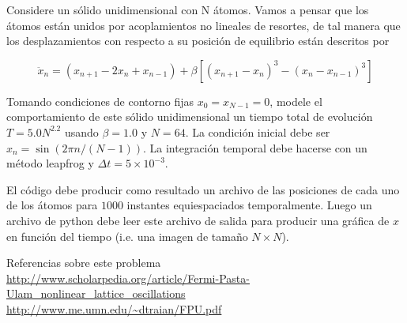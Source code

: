 \documentclass[11pt,letterpaper]{exam}
\begin{document}
\begin{questions}

Considere un s\'olido unidimensional con N \'atomos.
Vamos a pensar que los \'atomos est\'an unidos por acoplamientos no
lineales de resortes, de tal manera que los desplazamientos con respecto
a su posici\'on de equilibrio est\'an descritos por

\begin{equation}
\ddot{x}_n = (x_{n+1} - 2x_n + x_{n-1}) + \beta[(x_{n+1}-x_n)^3 - (x_n - x_{n-1})^3]
\end{equation}

Tomando condiciones de contorno fijas $x_{0}=x_{N-1}=0$, modele el comportamiento
de este s\'olido unidimensional un tiempo total de evoluci\'on $T=5.0N^{2.2}$
usando $\beta=1.0$ y $N=64$. La condici\'on inicial debe ser
$x_n = \sin(2\pi n/(N-1))$. La integraci\'on
temporal debe hacerse con un m\'etodo leapfrog y $\Delta t=5\times 10^{-3}$.

El c\'odigo debe producir como resultado un archivo de las posiciones
de cada uno de los \'atomos para $1000$ instantes equiespaciados
temporalmente.
Luego un archivo de python debe leer este archivo de salida para
producir una gr\'afica de $x$ en funci\'on del tiempo (i.e. una imagen
de tama\~no $N\times N$). 

Referencias sobre este problema\\
\url{http://www.scholarpedia.org/article/Fermi-Pasta-Ulam_nonlinear_lattice_oscillations}\\
\url{http://www.me.umn.edu/~dtraian/FPU.pdf}\\
\end{questions}
\end{document}
